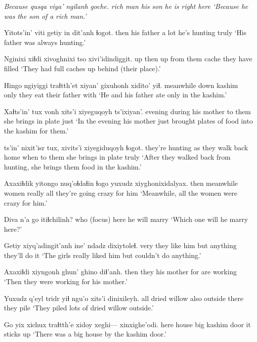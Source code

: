 \documentclass[12pt]{article}
\begin{document}
 

\gll \em Because \em qusqa    viya'   ngilanh goche.
{} {rich man} {his son} {he is}   {right here}
\glt `Because he was the son of a rich man.'
\glend

\gll Yitots'in' viti    getiy {in dit'anh} ɬogot.
then       {his father} {a lot} {he's hunting} truly
\glt `His father was always hunting.'    
\glend

\gll Nginixi xiɬdi xivoghnixi  tso   xivi'idindiggit.
up      then  {up from them} cache {they have filled}
\glt `They had full caches up behind (their place).'
\glend

\gll Hingo     ngiyiggi traɬtth'et xiyan' gixuhonh xidito' yiɬ. 
meanwhile down     kashim     only   {they eat} {their father} with
\glt `He and his father ate only in the kashim.'
\glend

\gll Xaɬts'in' tux    vonh       xits'i xiyeguqoyh          ts'ixiyan'.
evening   during {his mother} {to them} {she brings in plate} just
\glt `In the evening his mother just brought plates of food into the kashim for them.'
\glend

 ts'in' nixit'isr           tux,  xivits'i xiyegiduqoyh      ɬogot.
{they're hunting}    as   {they walk back home} when {to them} {she brings in plate} truly
\glt `After they walked back from hunting, she brings them food in the kashim.'
\glend

\gll Axaxiɬdik yitongo   nuq'oɬdaɬin ɬogo   yuxudz xiyghonixidalyax.
then      meanwhile women       really all    {they're going crazy for him}
\glt `Meanwhile, all the women were crazy for him.'
\glend

\gll Diva n'a go   itiɬchilinh?
who  {(focus)}  here {he will marry}
\glt `Which one will he marry here?'
\glend

\gll Getiy xiyq'adingit'anh ine' ndadz     dixiytoleɬ.
very  {they like him} but  anything {they'll do it}
\glt `The girls really liked him but couldn't do anything.'
\glend

\gll Axaxiɬdi xiyngonh ghun' {ghino diɬ'anh.}
then     {they his mother} for {are working}
\glt `Then they were working for his mother.'
\glend

\gll Yuxudz  {q'eyl tridr}   yiɬ ngu'o xits'i dinixileyh.
all     {dried willow} also {outside} there  {they pile}
\glt `They piled lots of dried willow outside.'
\glend

\gll Go   yix xichux  traɬtth'e xidoy xeghi--- xinxighe'odi.
here house big kashim    door {} {it sticks up}
\glt `There was a big house by the kashim door.'
\glend
\end{document}
